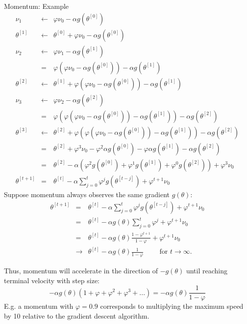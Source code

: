 \begin{vbframe}{Momentum: Example}
  \footnotesize 
  \begin{eqnarray*}
    \nu_{1} &\leftarrow& \varphi \nu_0 - \alpha g(\theta^{[0]}) \\[0.1cm]
    \theta^{[1]} &\leftarrow& \theta^{[0]} + \varphi \nu_0 - \alpha g(\theta^{[0]}) \\[0.1cm]
    \nu_{2} &\leftarrow& \varphi \nu_1 - \alpha g(\theta^{[1]}) \\
            &=& \varphi (\varphi \nu_0 - \alpha g(\theta^{[0]})) - \alpha g(\theta^{[1]}) \\[0.1cm]
    \theta^{[2]} &\leftarrow& \theta^{[1]} + \varphi (\varphi \nu_0 - \alpha g(\theta^{[0]})) - \alpha g(\theta^{[1]}) \\[0.1cm]
    \nu_{3} &\leftarrow& \varphi \nu_2 - \alpha g(\theta^{[2]}) \\
            &=& \varphi (\varphi (\varphi \nu_0 - \alpha g(\theta^{[0]})) - \alpha g(\theta^{[1]})) - \alpha g(\theta^{[2]}) \\[0.1cm]
    \theta^{[3]} &\leftarrow& \theta^{[2]} + \varphi (\varphi (\varphi \nu_0 - \alpha g(\theta^{[0]})) - \alpha g(\theta^{[1]})) - \alpha g(\theta^{[2]}) \\
            &=& \theta^{[2]} + \varphi^3\nu_0 - \varphi^2\alpha g(\theta^{[0]}) - \varphi \alpha g(\theta^{[1]}) - \alpha g(\theta^{[2]}) \\
            &=& \theta^{[2]} - \alpha(\varphi^2g(\theta^{[0]}) + \varphi^1g(\theta^{[1]}) + \varphi^0g(\theta^{[2]})) + \varphi^3 \nu_0 \\
\theta^{[t+1]} &=& \theta^{[t]} - \alpha \displaystyle\sum_{j = 0}^{t} \varphi^j g(\theta^{[t - j]}) + \varphi^{t+1}\nu_0
  \end{eqnarray*}
Suppose momentum always observes the same gradient $g(\theta)$:
  \footnotesize 
  \begin{eqnarray*}
    \theta^{[t+1]} &=& \theta^{[t]} - \alpha \displaystyle\sum_{j = 0}^{t} \varphi^j g(\theta^{[t-j]}) + \varphi^{t+1}\nu_0 \\
                 &=& \theta^{[t]} - \alpha g(\theta) \displaystyle\sum_{j = 0}^{t} \varphi^j + \varphi^{t+1}\nu_0 \\
                 &=& \theta^{[t]} - \alpha g(\theta) \frac{1 - \varphi^{t+1}}{1 - \varphi} + \varphi^{t+1} \nu_0 \\
                 &\to& \theta^{[t]} - \alpha g(\theta) \frac{1}{1 - \varphi} \qquad \text{ for } t \to \infty. 
  \end{eqnarray*}

Thus, momentum will accelerate in the direction of $-g(\theta)$ until reaching terminal velocity with step size: 
    $$-\alpha g(\theta)(1 + \varphi + \varphi^2 + \varphi^3 + ...) = -\alpha g(\theta) \frac{1}{1 - \varphi}$$
E.g. a momentum with $\varphi = 0.9$ corresponds to multiplying the maximum speed by 10 relative to the gradient descent algorithm. 
\end{vbframe}


